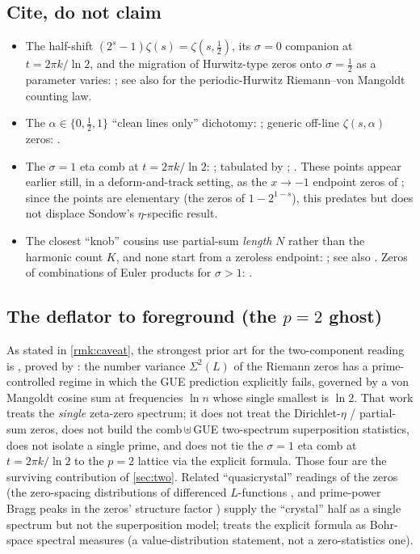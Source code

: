 \documentclass[11pt]{article}
\theoremstyle{definition}
\begin{document}
\subsection{Cite, do not claim}
\begin{itemize}[leftmargin=1.4em]
\item The half-shift $(2^{s}-1)\zeta(s)=\zeta(s,\tfrac12)$, its $\sigma=0$
  companion at $t=2\pi k/\ln 2$, and the migration of Hurwitz-type zeros onto
  $\sigma=\tfrac12$ as a parameter varies: \citet{Gonek1981,GarunkstisSteuding2007};
  see also \citet{GarunkstisTamosiunas2013} for the periodic-Hurwitz
  Riemann--von Mangoldt counting law.
\item The $\alpha\in\{0,\tfrac12,1\}$ ``clean lines only'' dichotomy:
  \citet{SaiasWeingartner2009}; generic off-line $\zeta(s,\alpha)$ zeros:
  \citet{DavenportHeilbronn1936,Cassels1961}.
\item The $\sigma=1$ eta comb at $t=2\pi k/\ln 2$: \citet{Sondow2003};
  tabulated by \citet{BeliakovMatiyasevich2015}; \citealp[\S25.2.3]{DLMF}. These
  points appear earlier still, in a deform-and-track setting, as the $x\to-1$
  endpoint zeros of \citet[Eq.~23]{FornbergKolbig1975}; since the points are
  elementary (the zeros of $1-2^{1-s}$), this predates but does not displace
  Sondow's $\eta$-specific result.
\item The closest ``knob'' cousins use partial-sum \emph{length} $N$ rather than
  the harmonic count $K$, and none start from a zeroless endpoint:
  \citet{GonekLedoan2010,GonekMontgomery2013}; see also
  \citet{PlattTrudgian2016}. Zeros of combinations of Euler products for
  $\sigma>1$: \citet{BookerThorne2014,Righetti2016}.
\end{itemize}

\subsection{The deflator to foreground (the $p=2$ ghost)}
As stated in \cref{rmk:caveat}, the strongest prior art for the two-component
reading is \citet{Berry1988}, proved by
\citet{LugarMilinovichQuesadaHerrera2022}: the number variance
$\Sigma^2(L)$ of the Riemann zeros has a prime-controlled regime in which the GUE
prediction explicitly fails, governed by a von Mangoldt cosine sum at frequencies
$\ln n$ whose single smallest is $\ln 2$. That work treats the \emph{single}
zeta-zero spectrum; it does not treat the Dirichlet-$\eta$ / partial-sum zeros,
does not build the comb\,$\uplus$\,GUE two-spectrum superposition statistics, does
not isolate a single prime, and does not tie the $\sigma=1$ eta comb at
$t=2\pi k/\ln 2$ to the $p=2$ lattice via the explicit formula. Those four are
the surviving contribution of \cref{sec:two}. Related ``quasicrystal''
readings of the zeros (the zero-spacing distributions of differenced
$L$-functions \citep{Lagarias2006}, and prime-power Bragg peaks in the zeros'
structure factor \citep{MadisonMadisonKozyrev2023,Shaughnessy2024}) supply the
``crystal'' half as a single spectrum but not the superposition model;
\citet{MoranLedezma2023} treats the explicit formula as Bohr-space spectral
measures (a value-distribution statement, not a zero-statistics one).
\end{document}
